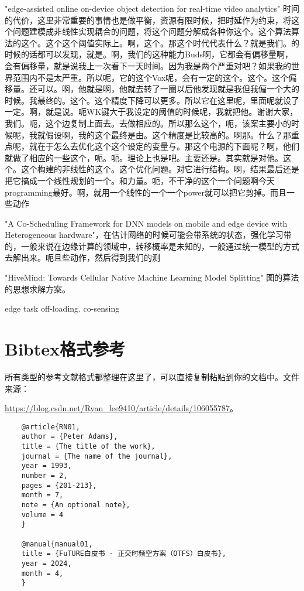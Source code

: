 \documentclass[12pt,a4paper]{article}%
\begin{document}
	"edge-assisted online on-device object detection for real-time video analytics" 时间的代价，这里非常重要的事情也是做平衡，资源有限时候，把时延作为约束，将这个问题建模成非线性实现耦合的问题，将这个问题分解成各种你这个。这个算法算法的这个。这个这个阈值实际上。啊，这个。那这个时代代表什么？就是我们。的时候的话都可以发现，就是。啊，我们的这种能力Buds啊，它都会有偏移量啊，会有偏移量，就是说我上一次看下一天时间。因为我是两个严重对吧？如果我的世界范围内不是太严重。所以呢，它的这个Vox呢，会有一定的这个。这个。这个偏移量。还可以。啊，他就是啊，他就去转了一圈以后他发现就是我但我偏一个大的时候。我最终的。这个。这个精度下降可以更多。所以它在这里呢，里面呢就设了一定。啊，就是说。呃WK键大于我设定的阈值的时候呢，我就把他。谢谢大家，我们。呃，这个边复制上面去。去做相应的。所以那么这个，呃，该案主要小的时候呢，我就假设啊，我的这个最终是由。这个精度是比较高的。啊那。什么？那重点呢，就在于怎么去优化这个这个设定的变量与。那这个电源的下面呢？啊，他们就做了相应的一些这个，呃。呃。理论上也是吧。主要还是。其实就是对他。这个。这个构建的非线性的这个。这个优化问题。对它进行结构。啊，结果最后还是把它搞成一个线性规划的一个。和力量。呃，不干净的这个一个问题啊今天programming最好。啊，就用一个线性的一个一个power就可以把它剪掉。而且一些动作

	"A Co-Scheduling Framework for DNN models on mobile and edge device with Heterogeneous hardware"，在估计网络的时候可能会带系统的状态，强化学习带的，一般来说在边缘计算的领域中，转移概率是未知的，一般通过统一模型的方式去解出来。呃且些动作，然后得到我们的测

	"HiveMind: Towards Cellular Native Machine Learning Model Splitting" 图的算法的思想求解方案。

	edge task off-loading. co-sensing 
	\section{Bibtex格式参考}
	所有类型的参考文献格式都整理在这里了，可以直接复制粘贴到你的文档中。文件来源：
	
	\url{https://blog.csdn.net/Ryan_lee9410/article/details/106055787}。

	\begin{verbatim}
	@article{RN01,
	author = {Peter Adams}, 
	title = {The title of the work},
	journal = {The name of the journal},
	year = 1993,
	number = 2,
	pages = {201-213},
	month = 7,
	note = {An optional note}, 
	volume = 4
	}

	@manual{manual01,
	title = {FuTURE白皮书 - 正交时频空方案（OTFS）白皮书},
	year = 2024,
	month = 4,
	}
	\end{verbatim}
    
\end{document}

